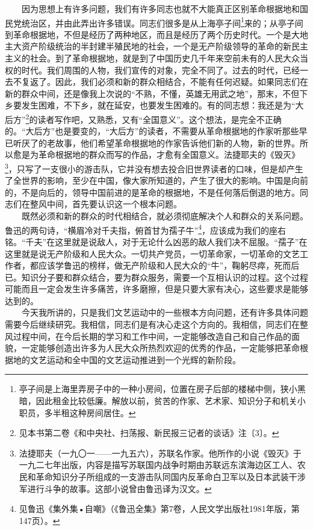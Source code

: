 \documentclass[cn,11pt,chinese]{elegantbook}
\begin{document}
　　因为思想上有许多问题，我们有许多同志也就不大能真正区别革命根据地和国民党统治区，并由此弄出许多错误。同志们很多是从上海亭子间\footnote[11]{ 亭子间是上海里弄房子中的一种小房间，位置在房子后部的楼梯中侧，狭小黑暗，因此租金比较低廉。解放以前，贫苦的作家、艺术家、知识分子和机关小职员，多半租这种房间居住。}来的；从亭子间到革命根据地，不但是经历了两种地区，而且是经历了两个历史时代。一个是大地主大资产阶级统治的半封建半殖民地的社会，一个是无产阶级领导的革命的新民主主义的社会。到了革命根据地，就是到了中国历史几千年来空前未有的人民大众当权的时代。我们周围的人物，我们宣传的对象，完全不同了。过去的时代，已经一去不复返了。因此，我们必须和新的群众相结合，不能有任何迟疑。如果同志们在新的群众中间，还是像我上次说的“不熟，不懂，英雄无用武之地”，那末，不但下乡要发生困难，不下乡，就在延安，也要发生困难的。有的同志想：我还是为“大后方”\footnote[12]{ 见本书第二卷《和中央社、扫荡报、新民报三记者的谈话》注〔3〕。}的读者写作吧，又熟悉，又有“全国意义”。这个想法，是完全不正确的。“大后方”也是要变的，“大后方”的读者，不需要从革命根据地的作家听那些早已听厌了的老故事，他们希望革命根据地的作家告诉他们新的人物，新的世界。所以愈是为革命根据地的群众而写的作品，才愈有全国意义。法捷耶夫的《毁灭》\footnote[13]{ 法捷耶夫（一九〇一——一九五六），苏联名作家。他所作的小说《毁灭》于一九二七年出版，内容是描写苏联国内战争时期由苏联远东滨海边区工人、农民和革命知识分子所组成的一支游击队同国内反革命白卫军以及日本武装干涉军进行斗争的故事。这部小说曾由鲁迅译为汉文。}，只写了一支很小的游击队，它并没有想去投合旧世界读者的口味，但是却产生了全世界的影响，至少在中国，像大家所知道的，产生了很大的影响。中国是向前的，不是向后的，领导中国前进的是革命的根据地，不是任何落后倒退的地方。同志们在整风中间，首先要认识这一个根本问题。\\
　　既然必须和新的群众的时代相结合，就必须彻底解决个人和群众的关系问题。鲁迅的两句诗，“横眉冷对千夫指，俯首甘为孺子牛”\footnote[14]{ 见鲁迅《集外集•自嘲》（《鲁迅全集》第7卷，人民文学出版社1981年版，第147页）。}，应该成为我们的座右铭。“千夫”在这里就是说敌人，对于无论什么凶恶的敌人我们决不屈服。“孺子”在这里就是说无产阶级和人民大众。一切共产党员，一切革命家，一切革命的文艺工作者，都应该学鲁迅的榜样，做无产阶级和人民大众的“牛”，鞠躬尽瘁，死而后已。知识分子要和群众结合，要为群众服务，需要一个互相认识的过程。这个过程可能而且一定会发生许多痛苦，许多磨擦，但是只要大家有决心，这些要求是能够达到的。\\
　　今天我所讲的，只是我们文艺运动中的一些根本方向问题，还有许多具体问题需要今后继续研究。我相信，同志们是有决心走这个方向的。我相信，同志们在整风过程中间，在今后长期的学习和工作中间，一定能够改造自己和自己作品的面貌，一定能够创造出许多为人民大众所热烈欢迎的优秀的作品，一定能够把革命根据地的文艺运动和全中国的文艺运动推进到一个光辉的新阶段。
\end{document}
